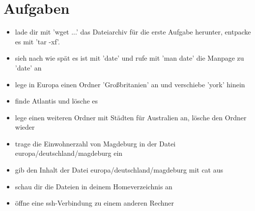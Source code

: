 \section {Aufgaben}

\begin{itemize}
\item lade dir mit 'wget ...' das Dateiarchiv für die erste Aufgabe herunter, entpacke es mit 'tar -xf'.
\item sieh nach wie spät es ist mit 'date' und rufe mit 'man date' die Manpage zu 'date' an
\item lege in Europa einen Ordner 'Großbritanien' an und verschiebe 'york' hinein
\item finde Atlantis und lösche es
\item lege einen weiteren Ordner mit Städten für Australien an, lösche den Ordner wieder
\item trage die Einwohnerzahl von Magdeburg in der Datei europa/deutschland/magdeburg ein
\item gib den Inhalt der Datei europa/deutschland/magdeburg mit cat aus
\item schau dir die Dateien in deinem Homeverzeichnis an
\item öffne eine ssh-Verbindung zu einem anderen Rechner
\end{itemize}
